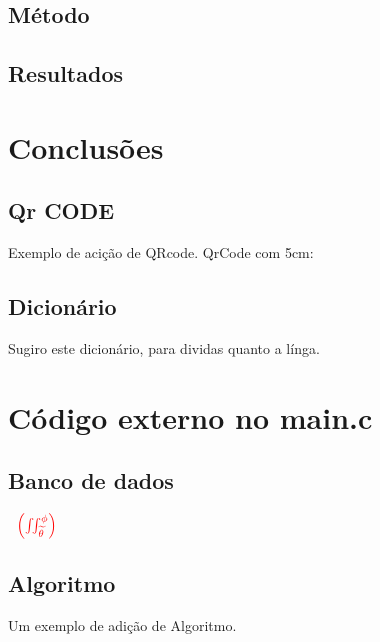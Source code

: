 \subsection{Método}
\lipsum[2-2]


\subsection{Resultados}
\lipsum[2-2]

\section{Conclusões}

\subsection{Qr CODE}
\par Exemplo de acição de QRcode.
\qquad
QrCode com 5cm:
\quad
{}

\subsection{Dicionário}

\par Sugiro este dicionário, para dividas quanto a línga.
\quad
{}

\section{Código externo no main.c}


\subsection{Banco de dados} \label{Banco de dados}

$\underline{{\color{Blue} }}{\color{red} \, \: \: \left ( \iint_{\widetilde{ \theta }}^{\phi } \right )}  $

\lipsum[2-4]

\subsection{Algoritmo}
\par Um exemplo de adição de Algoritmo. \\

